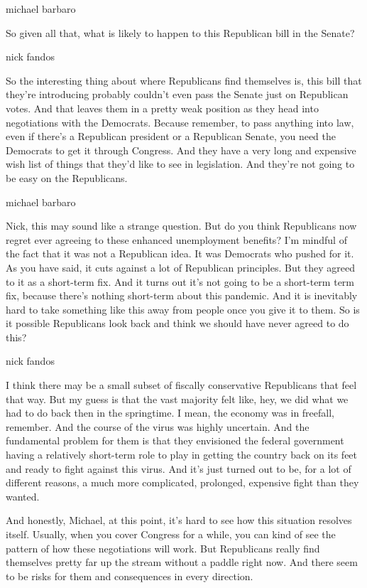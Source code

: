 michael barbaro

So given all that, what is likely to happen to this Republican bill in
the Senate?

nick fandos

So the interesting thing about where Republicans find themselves is,
this bill that they're introducing probably couldn't even pass the
Senate just on Republican votes. And that leaves them in a pretty weak
position as they head into negotiations with the Democrats. Because
remember, to pass anything into law, even if there's a Republican
president or a Republican Senate, you need the Democrats to get it
through Congress. And they have a very long and expensive wish list of
things that they'd like to see in legislation. And they're not going to
be easy on the Republicans.

michael barbaro

Nick, this may sound like a strange question. But do you think
Republicans now regret ever agreeing to these enhanced unemployment
benefits? I'm mindful of the fact that it was not a Republican idea. It
was Democrats who pushed for it. As you have said, it cuts against a lot
of Republican principles. But they agreed to it as a short-term fix. And
it turns out it's not going to be a short-term term fix, because there's
nothing short-term about this pandemic. And it is inevitably hard to
take something like this away from people once you give it to them. So
is it possible Republicans look back and think we should have never
agreed to do this?

nick fandos

I think there may be a small subset of fiscally conservative Republicans
that feel that way. But my guess is that the vast majority felt like,
hey, we did what we had to do back then in the springtime. I mean, the
economy was in freefall, remember. And the course of the virus was
highly uncertain. And the fundamental problem for them is that they
envisioned the federal government having a relatively short-term role to
play in getting the country back on its feet and ready to fight against
this virus. And it's just turned out to be, for a lot of different
reasons, a much more complicated, prolonged, expensive fight than they
wanted.

And honestly, Michael, at this point, it's hard to see how this
situation resolves itself. Usually, when you cover Congress for a while,
you can kind of see the pattern of how these negotiations will work. But
Republicans really find themselves pretty far up the stream without a
paddle right now. And there seem to be risks for them and consequences
in every direction.


